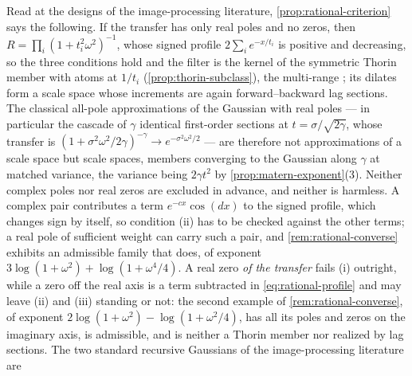 \begin{remark}
\label{rem:recursive-gaussians}
Read at the designs of the image-processing literature, \ref{prop:rational-criterion} says the
following. If the transfer has only real poles and no zeros, then
$R = \prod_i(1+t_i^2\omega^2)^{-1}$, whose signed profile $2\sum_i e^{-x/t_i}$ is positive and
decreasing, so the three conditions hold and the filter is the kernel of the symmetric Thorin
member with atoms at $1/t_i$ (\ref{prop:thorin-subclass}), the multi-range \Matern{}; its dilates
form a scale space whose increments are again forward--backward lag sections. The classical
all-pole approximations of the Gaussian with real poles --- in particular the cascade of $\gamma$
identical first-order sections at $t = \sigma/\sqrt{2\gamma}$, whose transfer is
$(1 + \sigma^2\omega^2/2\gamma)^{-\gamma} \to e^{-\sigma^2\omega^2/2}$ --- are therefore not
approximations of a scale space but scale spaces, \Matern{} members converging to the Gaussian
along $\gamma$ at matched variance, the variance being $2\gamma t^2$ by
\ref{prop:matern-exponent}(3). Neither complex poles nor real zeros are excluded in advance, and
neither is harmless. A complex pair contributes a term $e^{-cx}\cos(dx)$ to the signed profile,
which changes sign by itself, so condition (ii) has to be checked against the other terms; a real
pole of sufficient weight can carry such a pair, and \ref{rem:rational-converse} exhibits an
admissible family that does, of exponent $3\log(1+\omega^2) + \log(1+\omega^4/4)$. A real zero
\emph{of the transfer} fails (i) outright, while a zero off the real axis is a term subtracted in
\ref{eq:rational-profile} and may leave (ii) and (iii) standing or not: the second example of
\ref{rem:rational-converse}, of exponent $2\log(1+\omega^2) - \log(1+\omega^2/4)$, has all its
poles and zeros on the imaginary axis, is admissible, and is neither a Thorin member nor realized
by lag sections. The two standard recursive Gaussians of the image-processing literature are

\end{remark}
